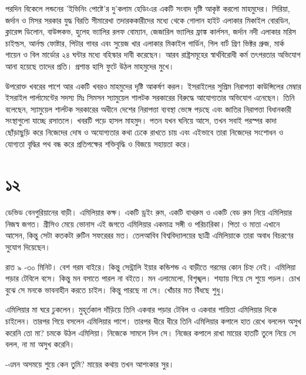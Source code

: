 \documentclass[
]{book}
\begin{document}
পরদিন বিকেলে লন্ডনের 'ইভিনিং পোষ্টে'র দু'কলাম হেডিংএর একটি সংবাদ দৃষ্টি আকৃষ্ট করলো মাহমুদের। সিরিয়া, জর্দান ও মিসর সরকার যুদ্ধ বিরতি সীমারেখা তদারককারীদের মধ্যে থেকে গোলান হাইট এলাকার মিকাইল বোরডিন, ক্লারেন্স ডিলোন, বাউন্সকভ, হুলেহ ভ্যালির রলফ বোম্যান, জেজারিল ভ্যালির ফ্রাঙ্ক কার্লসন, জর্দান নদী এলাকার মরিস চাইল্ডস, আর্নল্ড ফোষ্টার, পিটার গাবর এবং সুয়েজ খার এলাকার মিকাইল গার্ডিন, গিল বার্ট গ্রিণ ভিক্টর গ্রুজ, মার্ক গায়েন ও বিল মার্ডোর ২৪ ঘন্টার মধ্যে বহিস্কার দাবী করেছেন। আরব রাষ্ট্রসমূহের স্বার্থবিরোধী কর্ম তৎপরতার অভিযোগ আনা হয়েছে তাদের প্রতি। প্রশান্ত হাসি ফুটে উঠল মাহমুদের মুখে।

উপরোক্ত খবরের পাশে আর একটি খবরও মাহমুদের দৃষ্টি আকর্ষণ করল। ইসরাইলের সুপ্রিম নিরাপত্তা কাউন্সিলের মেম্বার ইসরাইল পার্লামেন্টের সদস্য মিঃ সিমসন স্যামুয়েল শালটক সরকারের বিরুদ্ধে আযোগ্যতার অভিযোগ এনেছেন। তিনি বলেছেন, স্যামুয়েল শার্লটক সরকারের অধীনে দেশের নিরাপত্তা ব্যবস্থা ভেঙ্গে পড়ছে এবং জাতির নিরাপত্তা বিধানকারী সংস্থাগুলো যাচ্ছে রসাতলে। খবরটি পড়ে হাসল মাহমুদ। পতন যখন ঘনিয়ে আসে, তখন সবাই পরস্পর কাদা ছোঁড়াছুড়ি করে নিজেদের দোষ ও অযোগ্যতার কথা ঢেকে রাখতে চায় এবং এইভাবে তারা নিজেদের সংশোধন ও যোগ্যতা বৃদ্ধির পথ বন্ধ করে প্রতিপক্ষের শক্তিবৃদ্ধি ও বিজয়ে সহায়তা করে।

\section*{১২}\label{ota-1-12}

ডেভিড বেনগুরিয়ানের বাড়ী। এমিলিয়ার কক্ষ। একটি ড্রইং রুম, একটি বাথরুম ও একটি বেড রুম নিয়ে এমিলিয়ার নিজস্ব জগত। গ্রীসিও মেয়ে ভোনাস এই জগতে এমিলিয়ার একমাত্র সঙ্গী ও পরিচারিকা। পিতা ও মাতা এখানে আসেন, কিন্তু সেটা কতকটা রুটিন সফরেরর মত। তেলআবিব বিশ্ববিদ্যালয়ের ছাত্রী এমিলিয়াকে তারা অবাধ বিচরণের সুযোগ দিয়েছেন।

রাত ৯ -৩০ মিনিট। বেশ গরম বাইরে। কিন্তু সেন্ট্রালি ইয়ার কন্ডিশন্ড এ বাড়ীতে গরমের কোন চিহ্ন নেই। এমিলিয়া পড়ার টেবিলে বসে। কিন্তু মন বসাতে পারল না বইতে। মন এলামেলো, বিশৃঙ্খল। শয্যায় গিয়ে সে শুয়ে পড়ল। চোখ বুঝে সে মনকে ভাবনাহীন করতে চাইল। কিন্তু পারছে না সে। খোঁচার মত বিঁধছে শুধু।

এমিলিয়ার মা ঘরে ঢুকলেন। মুহূর্তকাল দাঁড়িয়ে তিনি একবার পড়ার টেবিল ও একবার শায়িতা এমিলিয়ার দিকে চাইলেন। তারপর গিয়ে বসলেন এমিলিয়ার পাশে। তারপর ধীরে ধীরে তিনি এমিলিয়ার কপালে হাত রেখে বললেন অসুখ করেনি তো মা? চমকে উঠল এমিলিয়া। নিজেকে সামলে নিল সে। নিজের কপালে রাখা মায়ের হাতটি তুলে নিয়ে সে বলল, না মা অসুখ করেনি।

-এমন অসময়ে শুয়ে কেন তুমি? মায়ের কথায় তখন আশংকার সুর।
\end{document}
